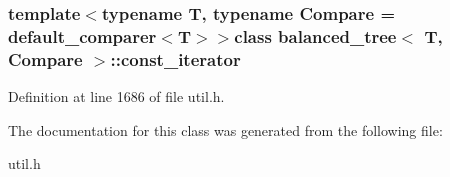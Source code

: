 \subsubsection*{template$<$typename T, typename Compare = default\+\_\+comparer$<$\+T$>$$>$class balanced\+\_\+tree$<$ T, Compare $>$\+::const\+\_\+iterator}



Definition at line 1686 of file util.\+h.



The documentation for this class was generated from the following file\+:\begin{DoxyCompactItemize}
\item 
util.\+h\end{DoxyCompactItemize}
